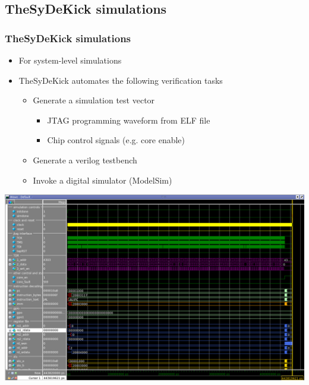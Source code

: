 \documentclass{sdkslides}
\begin{document}
\renewcommand{\sectionname}{TheSyDeKick simulations}
\subsection*{\sectionname}
\begin{frame}[t]
    \frametitle{\sectionname}
    \begin{itemize}
        \item For system-level simulations
        \item TheSyDeKick automates the following verification tasks
        \begin{itemize}
            \item Generate a simulation test vector
            \begin{itemize}
                \item JTAG programming waveform from ELF file
                \item Chip control signals (e.g. core enable)
            \end{itemize}
            \item Generate a verilog testbench
            \item Invoke a digital simulator (ModelSim)
        \end{itemize}
    \end{itemize}
    \begin{center}
        \includegraphics[width=0.65\linewidth]{./Pics/prog_sequence.png}
    \end{center}
\end{frame}

\renewcommand{\sectionname}{ACoreChip Entity}
\end{document}
